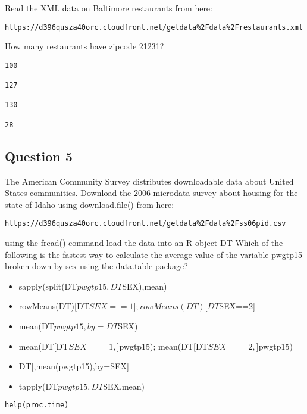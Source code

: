\documentclass[]{article}
\begin{document}
 
Read the XML data on Baltimore restaurants from here: 

\begin{verbatim}
https://d396qusza40orc.cloudfront.net/getdata%2Fdata%2Frestaurants.xml 
\end{verbatim}
How many restaurants have zipcode 21231? 

\begin{verbatim}
100 

127 

130 

28
\end{verbatim} 


\newpage
\subsection*{Question 5}
 
The American Community Survey distributes downloadable data about United States communities. Download the 2006 microdata survey about housing for the state of Idaho using download.file() from here:
 
\begin{verbatim}
https://d396qusza40orc.cloudfront.net/getdata%2Fdata%2Fss06pid.csv
\end{verbatim}
 using the fread() command load the data into an R object  DT  Which of the following is the fastest way to calculate the average value of the variable pwgtp15  broken down by sex using the data.table package? 

\begin{itemize}
\item sapply(split(DT$pwgtp15,DT$SEX),mean) 

\item rowMeans(DT)[DT$SEX==1]; rowMeans(DT)[DT$SEX==2] 

\item mean(DT$pwgtp15,by=DT$SEX) 

\item mean(DT[DT$SEX==1,]$pwgtp15); mean(DT[DT$SEX==2,]$pwgtp15) 

\item DT[,mean(pwgtp15),by=SEX] 

\item tapply(DT$pwgtp15,DT$SEX,mean)
\end{itemize}

\begin{framed}
\begin{verbatim}
help(proc.time)
\end{verbatim}
\end{framed}
\newpage
\end{document}
